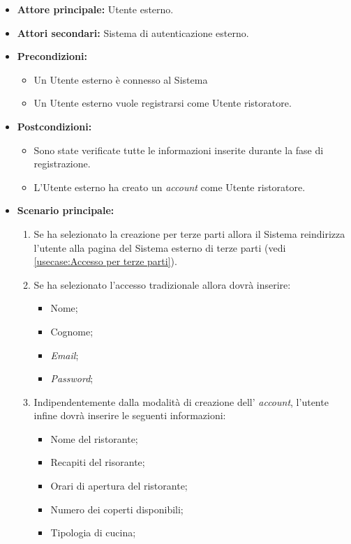 \label{usecase:Registrazione Utente ristoratore}
\begin{itemize}

	\item \textbf{Attore principale:} Utente esterno.
	\item \textbf{Attori secondari:} Sistema di autenticazione esterno. 

	\item \textbf{Precondizioni:} 
	\begin{itemize}
        \item  Un Utente esterno è connesso al Sistema
        \item  Un Utente esterno vuole registrarsi come Utente ristoratore.
    \end{itemize}
    

	\item \textbf{Postcondizioni:} 
    \begin{itemize}
        \item  Sono state verificate tutte le informazioni inserite durante la fase di registrazione.
        \item  L'Utente esterno ha creato un \textit{account} come Utente ristoratore.
    \end{itemize}

	\item \textbf{Scenario principale:}
	\begin{enumerate}

            \item Se ha selezionato la creazione per terze parti allora il Sistema reindirizza l'utente alla pagina del Sistema esterno di terze parti (vedi \autoref{usecase:Accesso per terze parti}).
            \item Se ha selezionato l'accesso tradizionale allora dovrà inserire:
            \begin{itemize}
                \item Nome;
                \item Cognome;
                \item \textit{Email};
                \item \textit{Password};
            \end{itemize}

            \item Indipendentemente dalla modalità di creazione dell' \textit{account}, l'utente infine dovrà inserire le seguenti informazioni:
                \begin{itemize}
                    \item Nome del ristorante;
                    \item Recapiti del risorante;
                    \item Orari di apertura del ristorante;
                    \item Numero dei coperti disponibili;
                    \item Tipologia di cucina;
                \end{itemize}
            
	\end{enumerate}
	
\end{itemize}